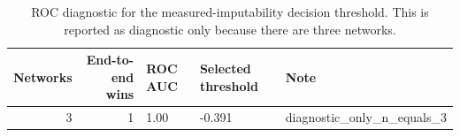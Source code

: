 \begin{table}
\caption{ROC diagnostic for the measured-imputability decision threshold. This is reported as diagnostic only because there are three networks.}
\label{tab:imputability_roc}
\begin{tabular}{rrlll}
\toprule
Networks & End-to-end wins & ROC AUC & Selected threshold & Note \\
\midrule
3 & 1 & 1.00 & -0.391 & diagnostic\_only\_n\_equals\_3 \\
\bottomrule
\end{tabular}
\end{table}
